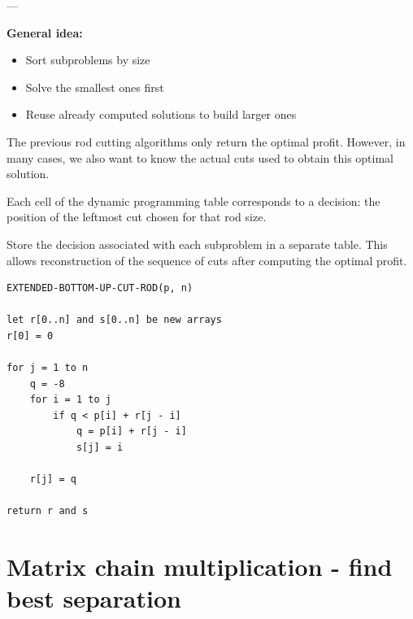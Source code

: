 \documentclass[11pt,a4paper,openany]{book}
\begin{document}
---

\textbf{General idea:}

\begin{itemize}
    \item Sort subproblems by size
    \item Solve the smallest ones first
    \item Reuse already computed solutions to build larger ones
\end{itemize}



\begin{defnbox}[title=Recovering the Optimal Solution]
The previous rod cutting algorithms only return the optimal profit.  
However, in many cases, we also want to know the actual cuts used to obtain this optimal solution.
\end{defnbox}

\begin{defnbox}[title=Main idea]
Each cell of the dynamic programming table corresponds to a decision:
the position of the leftmost cut chosen for that rod size.
\end{defnbox}

\begin{defnbox}[title=Approach]
Store the decision associated with each subproblem in a separate table.  
This allows reconstruction of the sequence of cuts after computing the optimal profit.
\end{defnbox}


\begin{lstlisting}
EXTENDED-BOTTOM-UP-CUT-ROD(p, n)

let r[0..n] and s[0..n] be new arrays
r[0] = 0

for j = 1 to n
    q = -8
    for i = 1 to j
        if q < p[i] + r[j - i]
            q = p[i] + r[j - i]
            s[j] = i

    r[j] = q

return r and s
\end{lstlisting}








\vspace{2cm}




\section{Matrix chain multiplication - find best separation}
\end{document}
